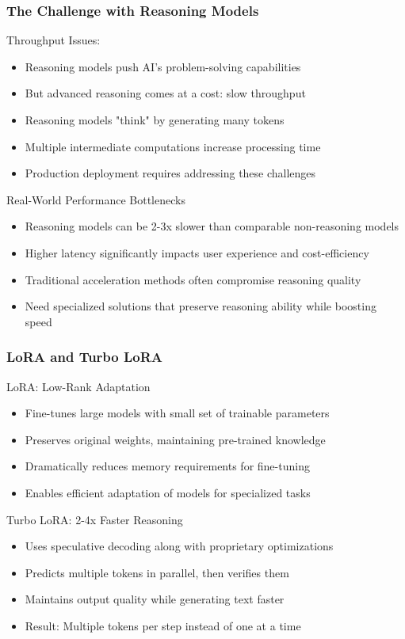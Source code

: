 \documentclass[aspectratio=169]{beamer}
\begin{document}
\begin{frame}
	\frametitle{The Challenge with Reasoning Models}
	\begin{block}{Throughput Issues:}
		\begin{itemize}
			\item Reasoning models push AI's problem-solving capabilities
			\item But advanced reasoning comes at a cost: slow throughput
			\item Reasoning models "think" by generating many tokens
			\item Multiple intermediate computations increase processing time
			\item Production deployment requires addressing these challenges
		\end{itemize}
	\end{block}
	\begin{block}{Real-World Performance Bottlenecks}
		\begin{itemize}
			\item Reasoning models can be 2-3x slower than comparable non-reasoning models
			\item Higher latency significantly impacts user experience and cost-efficiency
			\item Traditional acceleration methods often compromise reasoning quality
			\item Need specialized solutions that preserve reasoning ability while boosting speed
		\end{itemize}
	\end{block}
\end{frame}

\begin{frame}
	\frametitle{LoRA and Turbo LoRA}
	\begin{block}{LoRA: Low-Rank Adaptation}
		\begin{itemize}
			\item Fine-tunes large models with small set of trainable parameters
			\item Preserves original weights, maintaining pre-trained knowledge
			\item Dramatically reduces memory requirements for fine-tuning
			\item Enables efficient adaptation of models for specialized tasks
		\end{itemize}
	\end{block}
	\begin{block}{Turbo LoRA: 2-4x Faster Reasoning}
		\begin{itemize}
			\item Uses speculative decoding along with proprietary optimizations
			\item Predicts multiple tokens in parallel, then verifies them
			\item Maintains output quality while generating text faster
			\item Result: Multiple tokens per step instead of one at a time
		\end{itemize}
	\end{block}
\end{frame}
\end{document}
